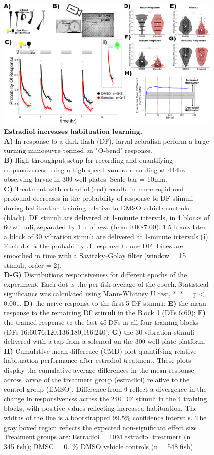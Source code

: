 \documentclass[10pt,lineno]{RandlettLab_elife}
\begin{document}
\begin{figure}
\begin{fullwidth}
\begin{center}
\includegraphics[width=0.65\linewidth]{figures/EstradiolEffect.png}
\caption{\textbf{Estradiol increases habituation learning.} \scriptsize
\\ \textbf{A)} In response to a dark flash (DF), larval zebrafish perform a large turning manoeuvre termed an "O-bend" response.
\\ \textbf{B)} High-throughput setup for recording and quantifying responsiveness using a high-speed camera recording at 444hz observing larvae in 300-well plates. Scale bar = 10mm.
\\ \textbf{C)} Treatment with estradiol (red) results in more rapid and profound decreases in the probability of response to DF stimuli during habituation training relative to DMSO vehicle controls (black). DF stimuli are delivered at 1-minute intervals, in 4 blocks of 60 stimuli, separated by 1hr of rest (from 0:00-7:00). 1.5 hours later a block of 30 vibration stimuli are delivered at 1-minute intervals (\textbf{i}). Each dot is the probability of response to one DF. Lines are smoothed in time with a Savitzky–Golay filter (window = 15 stimuli, order = 2). 
\\ \textbf{D-G)} Distributions responsiveness for different epochs of the experiment. Each dot is the per-fish average of the epoch. Statistical significance was calculated using Mann-Whitney U test, *** = p < 0.001.  \textbf{D)} the naive response to the first 5 DF stimuli; \textbf{E)} the mean response to the remaining DF stimuli in the Block 1 (DFs 6:60); \textbf{F)} the trained response to the last 45 DFs in all four training blocks (DFs 16:60,76:120,136:180,196:240); \textbf{G)} the 30 vibration stimuli delivered with a tap from a solenoid on the 300-well plate platform. 
\\ \textbf{H)} Cumulative mean difference (CMD) plot quantifying relative habituation performance after estradiol treatment. These plots display the cumulative average differences in the mean response across larvae of the treatment group (estradiol) relative to the control group (DMSO). Difference from 0 reflect a divergence in the change in responsiveness across the 240 DF stimuli in the 4 training blocks, with positive values reflecting increased habituation. The widths of the line is a bootstrapped 99.5\% confidence intervals. The gray boxed region reflects the expected non-significant effect size \citep{Randlett2019-fj}.
\\ Treatment groups are: Estradiol = 10\textmu M estradiol treatment (n = 345 fish); DMSO = 0.1\% DMSO vehicle controls (n = 548 fish)
}


\end{center}
\end{fullwidth}
\end{figure}
\end{document}
